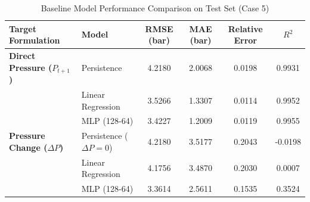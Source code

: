 \begin{table}[h]
\centering
\caption{Baseline Model Performance Comparison on Test Set (Case 5)}
\label{tab:baseline_results}
\begin{tabular}{llcccc}
\toprule
\textbf{Target Formulation} & \textbf{Model} & \textbf{RMSE (bar)} & \textbf{MAE (bar)} & \textbf{Relative Error} & \textbf{$R^2$} \\
\midrule
\textbf{Direct Pressure ($P_{t+1}$)} 
 & Persistence & 4.2180 & 2.0068 & 0.0198 & 0.9931 \\
 & Linear Regression & 3.5266 & 1.3307 & 0.0114 & 0.9952 \\
 & MLP (128-64) & 3.4227 & 1.2009 & 0.0119 & 0.9955 \\
\midrule
\textbf{Pressure Change ($\Delta P$)} 
 & Persistence ($\Delta P = 0$) & 4.2180 & 3.5177 & 0.2043 & -0.0198 \\
 & Linear Regression & 4.1756 & 3.4870 & 0.2030 & 0.0007 \\
 & MLP (128-64) & 3.3614 & 2.5611 & 0.1535 & 0.3524 \\
\bottomrule
\end{tabular}
\end{table}
